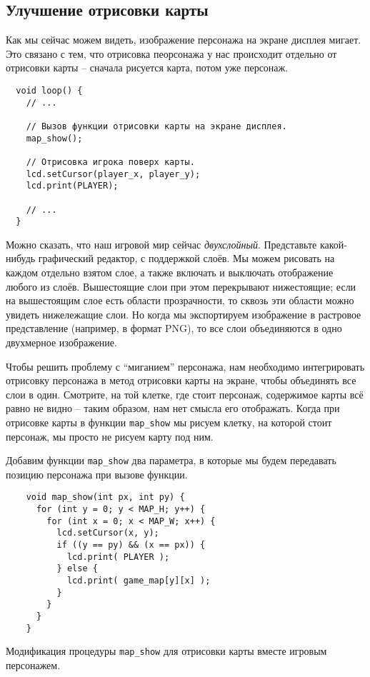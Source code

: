 \documentclass[../sparc.tex]{subfiles}
\begin{document}
\subsection{Улучшение отрисовки карты}

Как мы сейчас можем видеть, изображение персонажа на экране дисплея мигает. Это
связано с тем, что отрисовка пеорсонажа у нас происходит отдельно от отрисовки
карты -- сначала рисуется карта, потом уже персонаж.

\begin{verbatim}
  void loop() {
    // ...

    // Вызов функции отрисовки карты на экране дисплея.
    map_show();

    // Отрисовка игрока поверх карты.
    lcd.setCursor(player_x, player_y);
    lcd.print(PLAYER);

    // ...
  }
\end{verbatim}

Можно сказать, что наш игровой мир сейчас \emph{двухслойный}.  Представьте
какой-нибудь графический редактор, с поддержкой слоёв.  Мы можем рисовать на
каждом отдельно взятом слое, а также включать и выключать отображение любого из
слоёв.  Вышестоящие слои при этом перекрывают нижестоящие; если на вышестоящим
слое есть области прозрачности, то сквозь эти области можно увидеть нижележащие
слои.  Но когда мы экспортируем изображение в растровое представление (например,
в формат PNG), то все слои объединяются в одно двухмерное изображение.

Чтобы решить проблему с ``миганием'' персонажа, нам необходимо интегрировать
отрисовку персонажа в метод отрисовки карты на экране, чтобы объединять все слои
в один.  Смотрите, на той клетке, где стоит персонаж, содержимое карты всё равно
не видно -- таким образом, нам нет смысла его отображать.  Когда при отрисовке
карты в функции \texttt{map\_show} мы рисуем клетку, на которой стоит персонаж,
мы просто не рисуем карту под ним.

Добавим функции \texttt{map\_show} два параметра, в которые мы будем передавать
позицию персонажа при вызове функции.

\begin{listing}[H]
  \begin{verbatim}
    void map_show(int px, int py) {
      for (int y = 0; y < MAP_H; y++) {
        for (int x = 0; x < MAP_W; x++) {
          lcd.setCursor(x, y);
          if ((y == py) && (x == px)) {
            lcd.print( PLAYER );
          } else {
            lcd.print( game_map[y][x] );
          }
        }
      }
    }
  \end{verbatim}
  \caption{Модификация процедуры \texttt{map\_show} для отрисовки карты вместе
    игровым персонажем.}
  \label{listing:game-dev-map-show-improvement}
\end{listing}
\end{document}
